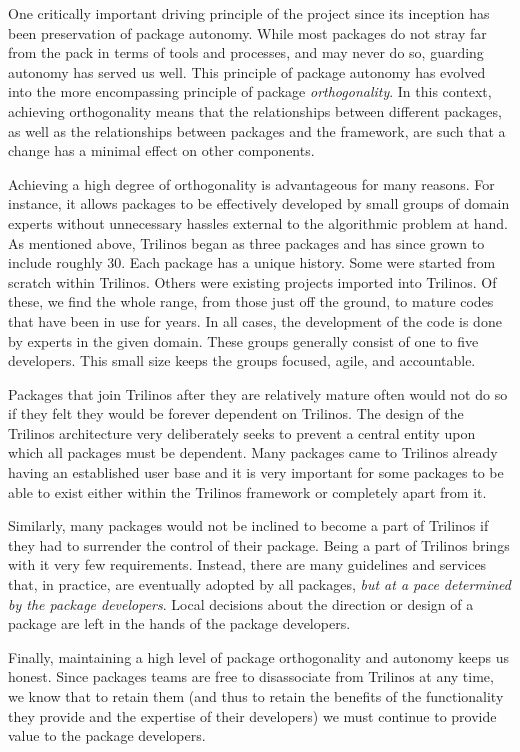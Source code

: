 \documentclass[times,10pt,twocolumn]{article}
\begin{document}
One critically important driving principle of the project since its
inception has been preservation of package autonomy.  While most
packages do not stray far from the pack in terms of tools and
processes, and may never do so, guarding autonomy has served us
well.  This principle of package autonomy has evolved into the more
encompassing principle of package \emph{orthogonality}.  In this
context, achieving orthogonality means that the relationships
between different packages, as well as the relationships between
packages and the framework, are such that a change has a minimal
effect on other components.

Achieving a high degree of orthogonality is advantageous for many
reasons. For instance, it allows packages to be effectively
developed by small groups of domain experts without unnecessary
hassles external to the algorithmic problem at hand.  As mentioned
above, Trilinos began as three packages and has since grown to
include roughly 30. Each package has a unique history. Some were
started from scratch within Trilinos.  Others were existing projects
imported into Trilinos.  Of these, we find the whole range, from
those just off the ground, to mature codes that have been in use for
years. In all cases, the development of the code is done by experts
in the given domain.  These groups generally consist of one to five
developers. This small size keeps the groups focused, agile, and
accountable.

Packages that join Trilinos after they are relatively mature often
would not do so if they felt they would be forever dependent on
Trilinos.  The design of the Trilinos architecture very deliberately
seeks to prevent a central entity upon which all packages must be
dependent.  Many packages came to Trilinos already having an
established user base and it is very important for some packages to
be able to exist either within the Trilinos framework or completely
apart from it.

Similarly, many packages would not be inclined to become a part of
Trilinos if they had to surrender the control of their package.
Being a part of Trilinos brings with it very few requirements.
Instead, there are many guidelines and services that, in practice,
are eventually adopted by all packages, \emph{but at a pace
determined by the package developers}. Local decisions about the
direction or design of a package are left in the hands of the
package developers.

Finally, maintaining a high level of package orthogonality and
autonomy keeps us honest. Since packages teams are free to
disassociate from Trilinos at any time, we know that to retain them
(and thus to retain the benefits of the functionality they provide
and the expertise of their developers) we must continue to provide
value to the package developers.
\end{document}
